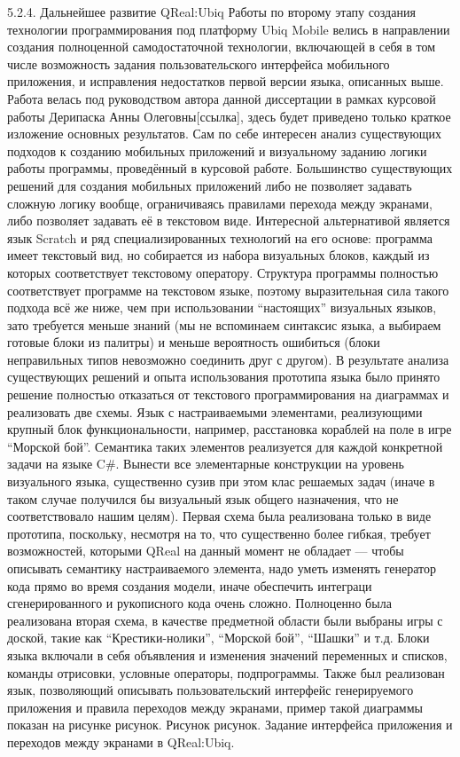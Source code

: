 5.2.4. Дальнейшее развитие QReal:Ubiq
	Работы по второму этапу создания технологии программирования под платформу Ubiq Mobile велись в направлении создания полноценной самодостаточной технологии, включающей в себя в том числе возможность задания пользовательского интерфейса мобильного приложения, и исправления недостатков первой версии языка, описанных выше. Работа велась под руководством автора данной диссертации в рамках курсовой работы Дерипаска Анны Олеговны[ссылка], здесь будет приведено только краткое изложение основных результатов.
	Сам по себе интересен анализ существующих подходов к созданию мобильных приложений и визуальному заданию логики работы программы, проведённый в курсовой работе. Большинство существующих решений для создания мобильных приложений либо не позволяет задавать сложную логику вообще, ограничиваясь правилами перехода между экранами, либо позволяет задавать её в текстовом виде. Интересной альтернативой является язык Scratch и ряд специализированных технологий на его основе: программа имеет текстовый вид, но собирается из набора визуальных блоков, каждый из которых соответствует текстовому оператору. Структура программы полностью соответствует программе на текстовом языке, поэтому выразительная сила такого подхода всё же ниже, чем при использовании “настоящих” визуальных языков, зато требуется меньше знаний (мы не вспоминаем синтаксис языка, а выбираем готовые блоки из палитры) и меньше вероятность ошибиться (блоки неправильных типов невозможно соединить друг с другом).
	В результате анализа существующих решений и опыта использования прототипа языка было принято решение полностью отказаться от текстового программирования на диаграммах и реализовать две схемы.
Язык с настраиваемыми элементами, реализующими крупный блок функциональности, например, расстановка кораблей на поле в игре “Морской бой”. Семантика таких элементов реализуется для каждой конкретной задачи на языке C#.
Вынести все элементарные конструкции на уровень визуального языка, существенно сузив при этом клас решаемых задач (иначе в таком случае получился бы визуальный язык общего назначения, что не соответствовало нашим целям). 
	Первая схема была реализована только в виде прототипа, поскольку, несмотря на то, что существенно более гибкая, требует возможностей, которыми QReal на данный момент не обладает --- чтобы описывать семантику настраиваемого элемента, надо уметь изменять генератор кода прямо во время создания модели, иначе обеспечить интеграци сгенерированного и рукописного кода очень сложно. Полноценно была реализована вторая схема, в качестве предметной области были выбраны игры с доской, такие как “Крестики-нолики”, “Морской бой”, “Шашки” и т.д. Блоки языка включали в себя объявления и изменения значений переменных и списков, команды отрисовки, условные операторы, подпрограммы. Также был реализован язык, позволяющий описывать пользовательский интерфейс генерируемого приложения и правила переходов между экранами, пример такой диаграммы показан на рисунке рисунок.
Рисунок рисунок. Задание интерфейса приложения и переходов между экранами в QReal:Ubiq.

